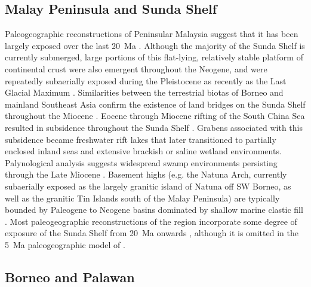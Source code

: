 \documentclass[11pt,letterpaper]{article}
\begin{document}
\subsection*{Malay Peninsula and Sunda Shelf}

Paleogeographic reconstructions of Peninsular Malaysia suggest that it has been largely exposed over the last 20~Ma \citep{Hall2002a, Hall2013b}. Although the majority of the Sunda Shelf is currently submerged, large portions of this flat-lying, relatively stable platform of continental crust were also emergent throughout the Neogene, and were repeatedly subaerially exposed during the Pleistocene as recently as the Last Glacial Maximum \citep{Hall2002a}. Similarities between the terrestrial biotas of Borneo and mainland Southeast Asia confirm the existence of land bridges on the Sunda Shelf throughout the Miocene \citep{Moss1998a}. Eocene through Miocene rifting of the South China Sea resulted in subsidence throughout the Sunda Shelf \citep{Morley2013a}. Grabens associated with this subsidence became freshwater rift lakes that later transitioned to partially enclosed inland seas and extensive brackish or saline wetland environments. Palynological analysis suggests widespread swamp environments persisting through the Late Miocene \citep{Morley2013a}. Basement highs (e.g. the Natuna Arch, currently subaerially exposed as the largely granitic island of Natuna off SW Borneo, as well as the granitic Tin Islands south of the Malay Peninsula) are typically bounded by Paleogene to Neogene basins dominated by shallow marine clastic fill \citep{Darmadi2007a}. Most paleogeographic reconstructions of the region incorporate some degree of exposure of the Sunda Shelf from 20~Ma onwards \citep{Hall2013b, Madon2013a}, although it is omitted in the 5~Ma paleogeographic model of \citet{Molnar2015a}.

\subsection*{Borneo and Palawan}
\end{document}

